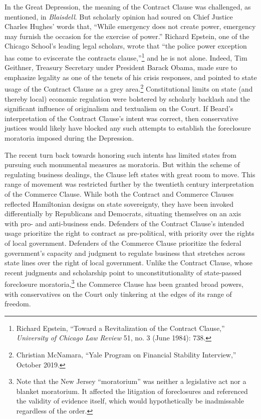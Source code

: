 \documentclass[12pt,oneside]{psthesis}
\begin{document}
In the Great Depression, the meaning of the Contract Clause was challenged, as mentioned, in \emph{Blaisdell}.
But scholarly opinion had soured on Chief Justice Charles Hughes' words that, ``While emergency does not create power, emergency may furnish the occasion for the exercise of power.''
Richard Epstein, one of the Chicago School's leading legal scholars, wrote that ``the police power exception has come to eviscerate the contracts clause,''\footnote{Richard Epstein, ``Toward a Revitalization of the Contract Clause,'' \emph{University of Chicago Law Review} 51, no. 3 (June 1984): 738.} and he is not alone.
Indeed, Tim Geithner, Treasury Secretary under President Barack Obama, made sure to emphasize legality as one of the tenets of his crisis responses, and pointed to state usage of the Contract Clause as a grey area.\footnote{Christian McNamara, ``Yale Program on Financial Stability Interview,'' October 2019.}
Constitutional limits on state (and thereby local) economic regulation were bolstered by scholarly backlash and the significant influence of originalism and textualism on the Court.
If Beard's interpretation of the Contract Clause's intent was correct, then conservative justices would likely have blocked any such attempts to establish the foreclosure moratoria imposed during the Depression.

The recent turn back towards honoring such intents has limited states from pursuing such monumental measures as moratoria.
But within the scheme of regulating business dealings, the Clause left states with great room to move.
This range of movement was restricted further by the twentieth century interpretation of the Commerce Clause.
While both the Contract and Commerce Clauses reflected Hamiltonian designs on state sovereignty, they have been invoked differentially by Republicans and Democrats, situating themselves on an axis with pro- and anti-business ends.
Defenders of the Contract Clause's intended usage prioritize the right to contract as pre-political, with priority over the rights of local government.
Defenders of the Commerce Clause prioritize the federal government's capacity and judgment to regulate business that stretches across state lines over the right of local government.
Unlike the Contract Clause, whose recent judgments and scholarship point to unconstitutionality of state-passed foreclosure moratoria,\footnote{Note that the New Jersey ``moratorium'' was neither a legislative act nor a blanket moratorium. It affected the litigation of foreclosures and referenced the validity of evidence itself, which would hypothetically be inadmissable regardless of the order.} the Commerce Clause has been granted broad powers, with conservatives on the Court only tinkering at the edges of its range of freedom.
\end{document}
